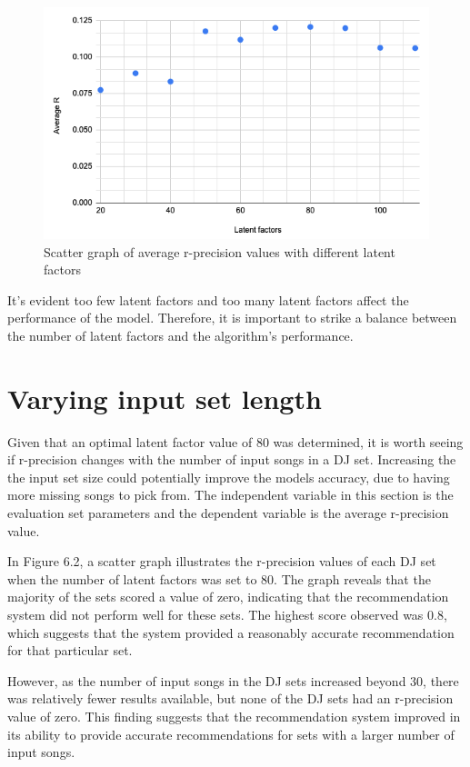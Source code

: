 \begin{figure}[H]
	\includegraphics[scale=0.6]{images/average_r_over_latent}
	\centering
	\caption{Scatter graph of average r-precision values with different latent factors} 
\end{figure}

It's evident too few latent factors and too many latent factors affect the performance of the model. Therefore, it is important to strike a balance between the number of latent factors and the algorithm's performance.

\section{Varying input set length}
Given that an optimal latent factor value of 80 was determined, it is worth seeing if r-precision changes with the number of input songs in a DJ set. Increasing the the input set size could potentially improve the models accuracy, due to having more missing songs to pick from. The independent variable in this section is the evaluation set parameters and the dependent variable is the average r-precision value.

In Figure 6.2, a scatter graph illustrates the r-precision values of each DJ set when the number of latent factors was set to 80. The graph reveals that the majority of the sets scored a value of zero, indicating that the recommendation system did not perform well for these sets. The highest score observed was 0.8, which suggests that the system provided a reasonably accurate recommendation for that particular set.

However, as the number of input songs in the DJ sets increased beyond 30, there was relatively fewer results available, but none of the DJ sets had an r-precision value of zero. This finding suggests that the recommendation system improved in its ability to provide accurate recommendations for sets with a larger number of input songs.

